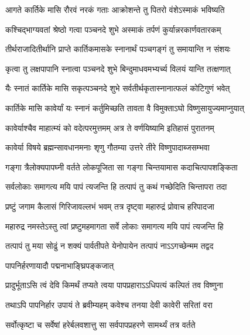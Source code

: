 \twolineshloka
{आगते कार्तिके मासि रौरवं नरकं गताः}
{आक्रोशन्ते तु पितरो वंशेऽस्माकं भविष्यति} %

\twolineshloka
{कश्चिद्भाग्यवतां श्रेष्ठो गत्वा पञ्चनदे शुभे}
{अस्माकं तर्पणं कुर्यान्नरकार्णवतारकम्} %

\twolineshloka
{तीर्थराजादितीर्थानि प्राप्ते कार्तिकमासके}
{स्नानार्थं पञ्चगङ्गं तु समायान्ति न संशयः} %

\twolineshloka
{कृत्वा तु लक्षपापानि स्नात्वा पञ्चनदे शुभे}
{बिन्दुमाधवमभ्यर्च्य विलयं यान्ति तत्क्षणात्} %

\twolineshloka
{यैः स्नातं कार्तिके मासि सकृत्पञ्चनदे शुभे}
{सर्वतीर्थकृतास्नानात्फलं कोटिगुणं भवेत्} %


\twolineshloka
{कार्तिके मासि कावेर्यां यः स्नानं कर्तुमिच्छति}
{तावता वै विमुक्ताऽघो विष्णुसायुज्यमाप्नुयात्} %

\twolineshloka
{कावेर्याश्चैव माहात्म्यं को वदेत्परमुत्तमम्}
{अत्र ते वर्णयिष्यामि इतिहासं पुरातनम्} %

\twolineshloka
{कावेर्या विषये ब्रह्मन्सावधानमनाः शृणु}
{गौतम्या उत्तरे तीरे विष्णुपादाब्जसम्भवा} %

\twolineshloka
{गङ्गा त्रैलोक्यपापघ्नी वर्तते लोकपूजिता}
{सा गङ्गा चिन्तयामास कदाचित्पापशङ्किता} %

\twolineshloka
{सर्वलोकाः समागत्य मयि पापं त्यजन्ति हि}
{तत्पापं तु कथं गच्छेदिति चिन्तापरा तदा} %

\twolineshloka
{प्रष्टुं जगाम कैलासं गिरिजावल्लभं भवम्}
{तत्र दृष्ट्वा महारुद्रं प्रोवाच हरिपादजा} %


\twolineshloka
{महारुद्र नमस्तेऽस्तु त्वां प्रष्टुमहमागता}
{सर्वे लोकाः समागत्य मयि पापं त्यजन्ति हि} %

\twolineshloka
{तत्पापं तु मया सोढुं न शक्यं पार्वतीपते}
{येनोपायेन तत्पापं नाऽऽगच्छेन्मम तद्वद} %




\onelineshloka
{पापनिर्हरणायादौ पद्मनाभाङ्घ्रिपङ्कजात्} %

\twolineshloka
{प्रादुर्भूताऽसि त्वं देवि किमर्थं तप्यते त्वया}
{पापप्रहाराऽऽधिपत्यं कल्पितं तव विष्णुना} %

\twolineshloka
{तथाऽपि पापनिर्हार उपायं ते ब्रवीम्यहम्}
{कवेश्च तनया देवी कावेरी सरितां वरा} %

\twolineshloka
{सर्वोत्कृष्टा च सर्वेषां हरेर्बलवशात्तु सा}
{सर्वपापप्रहरणे सामर्थ्यं तत्र वर्तते} %

